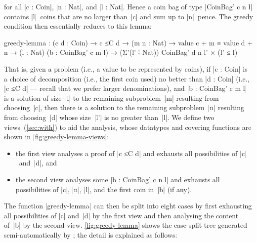 for all |c : Coin|, |n : Nat|, and |l : Nat|.
Hence a coin bag of type |CoinBag' c n l| contains |l|~coins that are no larger than~|c| and sum up to |n|~pence.
The greedy condition then essentially reduces to this lemma:
\begin{code}
greedy-lemma :  (c d : Coin) → c ≤C d →
                (m n : Nat) → value c + m ≡ value d + n →
                (l : Nat) (b : CoinBag' c m l) →
                (Σ'(l' ∶ Nat)) CoinBag' d n l' × (l' ≤ l)
\end{code}
That is, given a problem (i.e., a value to be represented by coins), if |c : Coin| is a choice of decomposition (i.e., the first coin used) no better than |d : Coin| (i.e., |c ≤C d| --- recall that we prefer larger denominations), and |b : CoinBag' c m l| is a solution of size~|l| to the remaining subproblem~|m| resulting from choosing~|c|, then there is a solution to the remaining subproblem~|n| resulting from choosing~|d| whose size~|l'| is no greater than~|l|.
We define two views~(\autoref{sec:with}) to aid the analysis, whose datatypes and covering functions are shown in \autoref{fig:greedy-lemma-views}:
\begin{itemize}
\item the first view analyses a proof of |c ≤C d| and exhausts all possibilities of |c|~and~|d|, and
\item the second view analyses some |b : CoinBag' c n l| and exhausts all possibilities of |c|, |n|, |l|, and the first coin in~|b| (if any).
\end{itemize}
The function |greedy-lemma| can then be split into eight cases by first exhausting all possibilities of |c| and~|d| by the first view and then analysing the content of~|b| by the second view.
\autoref{fig:greedy-lemma} shows the case-split tree generated semi-automatically by \Agda; the detail is explained as follows:
